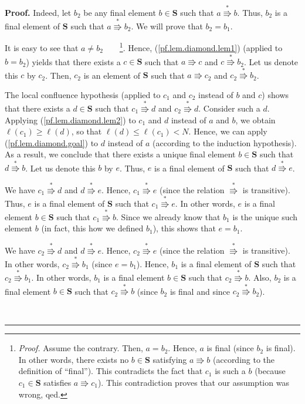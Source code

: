 \documentclass[numbers=enddot,12pt,final,onecolumn,notitlepage]{scrartcl}%
\theoremstyle{definition}
\newenvironment{proof}[1][Proof]{\noindent\textbf{#1.} }{\ \rule{0.5em}{0.5em}}
\newenvironment{verlong}{}{}
\begin{document}
\begin{verlong}
\begin{proof}
Indeed, let $b_{2}$ be any final element $b\in\mathbf{S}$ such that
$a\overset{\ast}{\Rrightarrow}b$. Thus, $b_{2}$ is a final element of
$\mathbf{S}$ such that $a\overset{\ast}{\Rrightarrow}b_{2}$. We will prove
that $b_{2}=b_{1}$.

It is easy to see that $a\neq b_{2}$\ \ \ \ \footnote{\textit{Proof.} Assume
the contrary. Then, $a=b_{2}$. Hence, $a$ is final (since $b_{2}$ is final).
In other words, there exists no $b\in\mathbf{S}$ satisfying $a\Rrightarrow b$
(according to the definition of \textquotedblleft final\textquotedblright).
This contradicts the fact that $c_{1}$ is such a $b$ (because $c_{1}%
\in\mathbf{S}$ satisfies $a\Rrightarrow c_{1}$). This contradiction proves
that our assumption was wrong, qed.}. Hence, (\ref{pf.lem.diamond.lem1})
(applied to $b=b_{2}$) yields that there exists a $c\in\mathbf{S}$ such that
$a\Rrightarrow c$ and $c\overset{\ast}{\Rrightarrow}b_{2}$. Let us denote this
$c$ by $c_{2}$. Then, $c_{2}$ is an element of $\mathbf{S}$ such that
$a\Rrightarrow c_{2}$ and $c_{2}\overset{\ast}{\Rrightarrow}b_{2}$.

The local confluence hypothesis (applied to $c_{1}$ and $c_{2}$ instead of $b$
and $c$) shows that there exists a $d\in\mathbf{S}$ such that $c_{1}%
\overset{\ast}{\Rrightarrow}d$ and $c_{2}\overset{\ast}{\Rrightarrow}d$.
Consider such a $d$. Applying (\ref{pf.lem.diamond.lem2}) to $c_{1}$ and $d$
instead of $a$ and $b$, we obtain $\ell\left(  c_{1}\right)  \geq\ell\left(
d\right)  $, so that $\ell\left(  d\right)  \leq\ell\left(  c_{1}\right)  <N$.
Hence, we can apply (\ref{pf.lem.diamond.goal}) to $d$ instead of $a$
(according to the induction hypothesis). As a result, we conclude that there
exists a unique final element $b\in\mathbf{S}$ such that $d\overset{\ast
}{\Rrightarrow}b$. Let us denote this $b$ by $e$. Thus, $e$ is a final element
of $\mathbf{S}$ such that $d\overset{\ast}{\Rrightarrow}e$.

We have $c_{1}\overset{\ast}{\Rrightarrow}d$ and $d\overset{\ast
}{\Rrightarrow}e$. Hence, $c_{1}\overset{\ast}{\Rrightarrow}e$ (since the
relation $\overset{\ast}{\Rrightarrow}$ is transitive). Thus, $e$ is a final
element of $\mathbf{S}$ such that $c_{1}\overset{\ast}{\Rrightarrow}e$. In
other words, $e$ is a final element $b\in\mathbf{S}$ such that $c_{1}%
\overset{\ast}{\Rrightarrow}b$. Since we already know that $b_{1}$ is the
unique such element $b$ (in fact, this how we defined $b_{1}$), this shows
that $e=b_{1}$.

We have $c_{2}\overset{\ast}{\Rrightarrow}d$ and $d\overset{\ast
}{\Rrightarrow}e$. Hence, $c_{2}\overset{\ast}{\Rrightarrow}e$ (since the
relation $\overset{\ast}{\Rrightarrow}$ is transitive). In other words,
$c_{2}\overset{\ast}{\Rrightarrow}b_{1}$ (since $e=b_{1}$). Hence, $b_{1}$ is
a final element of $\mathbf{S}$ such that $c_{2}\overset{\ast}{\Rrightarrow
}b_{1}$. In other words, $b_{1}$ is a final element $b\in\mathbf{S}$ such that
$c_{2}\overset{\ast}{\Rrightarrow}b$. Also, $b_{2}$ is a final element
$b\in\mathbf{S}$ such that $c_{2}\overset{\ast}{\Rrightarrow}b$ (since $b_{2}$
is final and since $c_{2}\overset{\ast}{\Rrightarrow}b_{2}$).


\end{proof}
\end{verlong}
\end{document}
